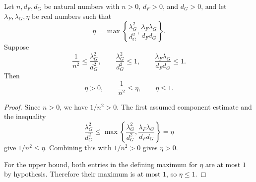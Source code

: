 \begin{helper}
Let \(n,d_F,d_G\) be natural numbers with \(n>0\), \(d_F>0\), and \(d_G>0\),
and let
\(\lambda_F,\lambda_G,\eta\) be real numbers such that
\[
  \eta=
  \max\left\{
    \frac{\lambda_G^2}{d_G^2},
    \frac{\lambda_F\lambda_G}{d_Fd_G}
  \right\}.
\]
Suppose
\[
  \frac1{n^2}\le \frac{\lambda_G^2}{d_G^2},\qquad
  \frac{\lambda_G^2}{d_G^2}\le 1,\qquad
  \frac{\lambda_F\lambda_G}{d_Fd_G}\le 1.
\]
Then
\[
  \eta>0,\qquad \frac1{n^2}\le \eta,\qquad \eta\le 1.
\]
\end{helper}
\begin{proof}
Since \(n>0\), we have \(1/n^2>0\).  The first assumed component estimate and
the inequality
\[
  \frac{\lambda_G^2}{d_G^2}
  \le
  \max\left\{
    \frac{\lambda_G^2}{d_G^2},
    \frac{\lambda_F\lambda_G}{d_Fd_G}
  \right\}
  =\eta
\]
give \(1/n^2\le\eta\).  Combining this with \(1/n^2>0\) gives \(\eta>0\).

For the upper bound, both entries in the defining maximum for \(\eta\) are at
most \(1\) by hypothesis.  Therefore their maximum is at most \(1\), so
\(\eta\le1\).
\end{proof}
